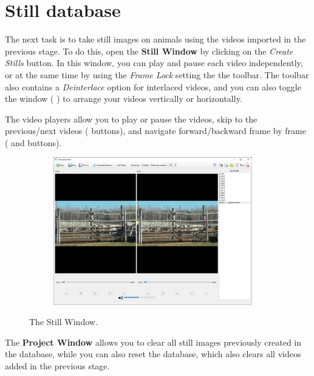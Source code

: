 \documentclass[10pt,a4paper,oneside]{report}             %
\newcommand*{\img}[1]{%
	\raisebox{-.02\baselineskip}{%
		\texttt{[image: \#1]}%
	}%
}
\begin{document}
\section{Still database}

The next task is to take still images on animals using the videos imported in the previous stage. To do this, open the \textbf{Still Window} by clicking on the \textit{Create Stills} button. In this window, you can play and pause each video independently, or at the same time by using the \textit{Frame Lock} setting the the toolbar. The toolbar also contains a \textit{Deinterlace} option for interlaced videos, and you can also toggle the window (\img{../VAM/Icons/if_tile_windows_horizontally_16x16_10026.png}) to arrange your videos vertically or horizontally.

The video players allow you to play or pause the videos, skip to the previous/next videos (\img{../VAM/Icons/1462036208_Skip-Backward.png} \img{../VAM/Icons/1462036208_Skip-Forward.png} buttons), and navigate forward/backward frame by frame (\img{../VAM/Icons/1462036188_Fast-Backward.png} and \img{../VAM/Icons/1462036188_Fast-Forward.png} buttons).

\begin{figure}[H]
	\centering
	\begin{subfigure}{\textwidth}
		\centering 
		\includegraphics[width=0.95\textwidth]{./images/VideoW.png}
	\end{subfigure}
	\caption[]
	{\small  The Still Window.}
\end{figure} 

The \textbf{Project Window} allows you to clear all still images previously created in the database, while you can also reset the database, which also clears all videos added in the previous stage.
\end{document}
